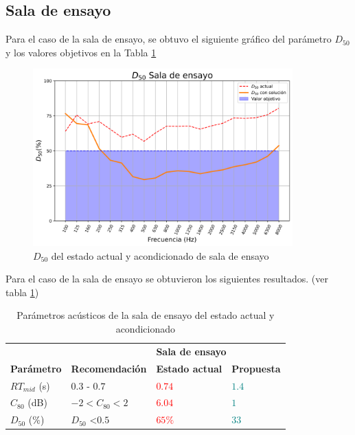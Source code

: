 \subsection{Sala de ensayo}
Para el caso de la sala de ensayo, se obtuvo el siguiente gráfico del parámetro $D_{50}$ y los valores objetivos en la Tabla \ref{tab: resultados sala de ensayo}
\begin{figure}[H]
    \centering
    \includegraphics[width=10cm]{Imagenes/Resultados/D50_comparacion.png}
    \caption{$D_{50}$ del estado actual y acondicionado de sala de ensayo}
    \label{fig: D50 de la sala de ensayo acond}
\end{figure}


Para el caso de la sala de ensayo se obtuvieron los siguientes resultados. (ver tabla \ref{tab: resultados sala de ensayo})
\begin{table}[H]
    \centering
    \begin{tabular}{|l|l|ll|}
    \hline
     &  & \multicolumn{2}{l|}{\textbf{Sala de ensayo}} \\ \cline{3-4} 
    \multirow{-2}{*}{\textbf{Parámetro}} & \multirow{-2}{*}{\textbf{Recomendación}} & \multicolumn{1}{l|}{\textbf{Estado actual}} & \textbf{Propuesta} \\ \hline
    $RT_{mid}$ (s) & $0.3$ - $0.7$ & \multicolumn{1}{l|}{\textcolor{red}{$0.74$}} & \textcolor{teal}{$1.4$} \\ \hline
    $C_{80}$ (dB) & $-2<C_{80}<2$ & \multicolumn{1}{l|}{\textcolor{red}{$6.04$}} & \textcolor{teal}{$1$} \\ \hline
    $D_{50}$ ($\%$) & $D_{50}$ \textless $0.5$ & \multicolumn{1}{l|}{\textcolor{red}{$65\%$}} & \textcolor{teal}{$33$} \\ \hline
    \end{tabular}
    \caption{Parámetros acústicos de la sala de ensayo del estado actual y acondicionado}
    \label{tab: resultados sala de ensayo}
\end{table}
